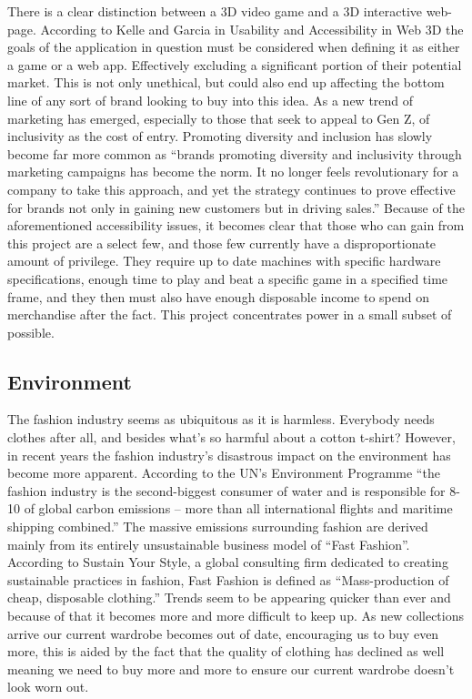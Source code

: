 \documentclass[10pt,twocolumn]{article}
\begin{document}
 
There is a clear distinction between a 3D video game and a 3D interactive web-page. According to Kelle and Garcia in Usability and Accessibility in Web 3D the goals of the application in question must be considered when defining it as either a game or a web app. Effectively excluding a significant portion of their potential market. This is not only unethical, but could also end up affecting the bottom line of any sort of brand looking to buy into this idea. As a new trend of marketing has emerged, especially to those that seek to appeal to Gen Z, of inclusivity as the cost of entry. Promoting diversity and inclusion has slowly become far more common as “brands promoting diversity and inclusivity through marketing campaigns has become the norm. It no longer feels revolutionary for a company to take this approach, and yet the strategy continues to prove effective for brands not only in gaining new customers but in driving sales.” \cite{ScarcitySupreme}
Because of the aforementioned accessibility issues, it becomes clear that those who can gain from this project are a select few, and those few currently have a disproportionate amount of privilege. They require up to date machines with specific hardware specifications, enough time to play and beat a specific game in a specified time frame, and they then must also have enough disposable income to spend on merchandise after the fact. This project concentrates power in a small subset of possible.

\subsection{Environment}


The fashion industry seems as ubiquitous as it is harmless. Everybody needs clothes after all, and besides what’s so harmful about a cotton t-shirt? However, in recent years the fashion industry’s disastrous impact on the environment has become more apparent. According to the UN’s Environment Programme “the fashion industry is the second-biggest consumer of water and is responsible for 8-10 of global carbon emissions – more than all international flights and maritime shipping combined.” \cite{UNFashion} The massive emissions surrounding fashion are derived mainly from its entirely unsustainable business model of “Fast Fashion”. According to Sustain Your Style, a global consulting firm dedicated to creating sustainable practices in fashion, Fast Fashion is defined as “Mass-production of cheap, disposable clothing.” \cite{SustainYourStyle} Trends seem to be appearing quicker than ever and because of that it becomes more and more difficult to keep up. As new collections arrive our current wardrobe becomes out of date, encouraging us to buy even more, this is aided by the fact that the quality of clothing has declined as well meaning we need to buy more and more to ensure our current wardrobe doesn’t look worn out. 
\end{document}
